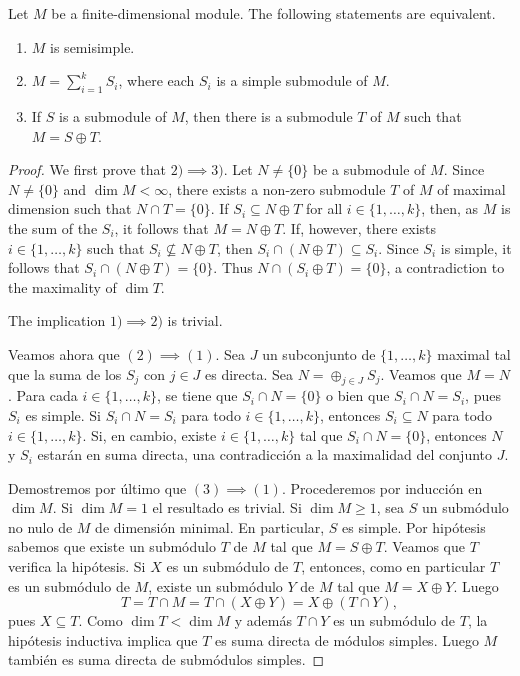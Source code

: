 \begin{proposition}
\label{pro:semisimple}
	Let $M$ be a finite-dimensional module. The following statements are equivalent.
	\begin{enumerate}
		\item $M$ is semisimple.
		\item $M=\sum_{i=1}^k S_i$, where each $S_i$ is a simple submodule of $M$. 
		\item If $S$ is a submodule of $M$, then there is a submodule $T$ of $M$ such that $M=S\oplus T$.    
	\end{enumerate}
\end{proposition}

\begin{proof}
	We first prove that $2)\implies3)$.
	Let $N\ne\{0\}$ be a submodule of $M$. Since $N\ne\{0\}$ and $\dim M<\infty$, there exists a non-zero submodule 
	$T$ of $M$ of maximal dimension such that 
	$N\cap T=\{0\}$. If $S_i\subseteq N\oplus T$ for all $i\in\{1,\dots,k\}$, then, as $M$ is the sum of the $S_i$, it follows that
	$M=N\oplus T$. 
	If, however, there exists $i\in\{1,\dots,k\}$ such that $S_i\not\subseteq N\oplus T$, then $S_i\cap (N\oplus T)\subseteq S_i$. 
	Since $S_i$ is simple,
	it follows that $S_i\cap (N\oplus T)=\{0\}$. Thus $N\cap (S_i\oplus T)=\{0\}$, a contradiction to the maximality of
	$\dim T$.  
	
	The implication  $1)\implies2)$ is trivial. 
	
	Veamos ahora que $(2)\implies(1)$. Sea $J$ un subconjunto de $\{1,\dots,k\}$ maximal tal que 
	la suma de los $S_j$ con $j\in J$ es directa. Sea $N=\oplus_{j\in J}S_j$. Veamos que $M=N$. 
	Para cada $i\in\{1,\dots,k\}$, se tiene que $S_i\cap N=\{0\}$ o bien que $S_i\cap N=S_i$, pues
	$S_i$ es simple. Si $S_i\cap N=S_i$ para todo $i\in\{1,\dots,k\}$, entonces $S_i\subseteq N$ para todo $i\in\{1,\dots,k\}$.  
	Si, en cambio, existe $i\in\{1,\dots,k\}$ tal que $S_i\cap N=\{0\}$, entonces $N$ y $S_i$ estarán en suma directa, 
	una contradicción a la maximalidad del conjunto $J$.
	
	Demostremos por último que $(3)\implies(1)$. 
	Procederemos por inducción en $\dim M$. Si $\dim M=1$ el resultado es trivial. Si $\dim M\geq1$, 
	sea $S$ un submódulo no nulo de $M$ de dimensión minimal. En particular, $S$ es simple. 
	Por hipótesis sabemos que existe un submódulo $T$ de $M$ tal que $M=S\oplus T$. Veamos que $T$ verifica la hipótesis. 
	Si $X$ es un submódulo de $T$, entonces, como en particular $T$ es un submódulo de $M$, existe un submódulo $Y$ de $M$ tal que
	$M=X\oplus Y$. Luego 
	\[
	T=T\cap M=T\cap (X\oplus Y)=X\oplus (T\cap Y),
	\]
	pues $X\subseteq T$. 
	Como $\dim T<\dim M$ y además $T\cap Y$ es un submódulo de $T$, la hipótesis inductiva 
	implica que $T$ es suma directa de módulos simples. Luego $M$ también es suma
	directa de submódulos simples. 
\end{proof}

